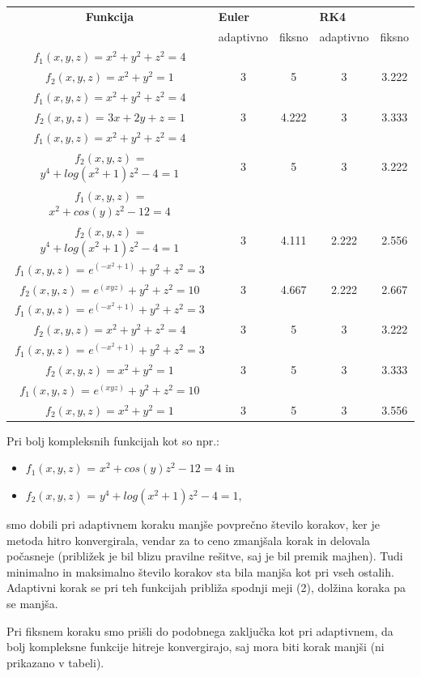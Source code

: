 \documentclass[12pt]{article}
\begin{document}
	\begin{tabular}{|c | c | c | c | c |} 
		\hline
		\textbf{Funkcija} &\multicolumn{2}{|l|}{\textbf{Euler}} &\multicolumn{2}{|l|}{\textbf{RK4}}\\                
		\small &adaptivno & fiksno & adaptivno & fiksno \\ 
		\hline
		\small{}$f_{1}(x,y,z)=x^{2} + y^{2}+ z^{2}=4$ & & & &\\ 
		\small{}$f_{2}(x,y,z)=x^{2} + y^{2}    =1$  & 3 & 5 & 3 & 3.222 \\
		\hline
		\small{}$f_{1}(x,y,z)=x^{2} + y^{2}+ z^{2}=4$ & & & &\\ 
		\small{}$f_{2}(x,y,z)$ = $3x + 2y + z = 1$  & 3 & 4.222 & 3 & 3.333 \\
		\hline
		\small{}$f_{1}(x,y,z)=x^{2} + y^{2}+ z^{2}=4$ & & & &\\ 
		\small{}$f_{2}(x,y,z)$ = $y^4 + log(x^2 + 1)z^2 - 4 = 1$  & 3 & 5 & 3 & 3.222 \\
		\hline
		\small{}$f_{1}(x,y,z)$ = $x^2 + cos(y)z^2 - 12 = 4$ & & & &\\ 
		\small{}$f_{2}(x,y,z)$ = $y^4 + log(x^2 + 1)z^2 - 4 = 1$  & 3 & 4.111 & 2.222 & 2.556 \\
		\hline
		\small{}$f_{1}(x,y,z)$ = $e^{(-x^{2}+1)}+y^{2}+z^{2} = 3$ & & & &\\ 
		\small{}$f_{2}(x,y,z)$ = $e^{(xyz)}+y^{2}+z^{2} = 10$  & 3 & 4.667 & 2.222 & 2.667 \\
		\hline
		\small{}$f_{1}(x,y,z)$ = $e^{(-x^{2}+1)}+y^{2}+z^{2} = 3$ & & & &\\ 
		\small{}$f_{2}(x,y,z)=x^{2} + y^{2}+ z^{2}=4$  & 3 & 5 & 3 & 3.222 \\
		\hline
		\small{}$f_{1}(x,y,z)$ = $e^{(-x^{2}+1)}+y^{2}+z^{2} = 3$ & & & &\\ 
		\small{}$f_{2}(x,y,z)=x^{2} + y^{2}    =1$  & 3 & 5 & 3 & 3.333 \\
		\hline
		\small{}$f_{1}(x,y,z)$ = $e^{(xyz)}+y^{2}+z^{2} = 10$ & & & &\\ 
		\small{}$f_{2}(x,y,z)=x^{2} + y^{2}    =1$  & 3 & 5 & 3 & 3.556 \\
		\hline
	\end{tabular}
	\newline
	\newline
	Pri bolj kompleksnih funkcijah kot so npr.:
	\begin{itemize}
		\item $f_{1}(x,y,z)$ = $x^2 + cos(y)z^2 - 12 = 4$  in \item $f_{2}(x,y,z)$ = $y^4 + log(x^2 + 1)z^2 - 4 = 1$,
	\end{itemize}
	smo dobili pri adaptivnem koraku manjše povprečno število korakov, ker je metoda hitro konvergirala, vendar za to ceno zmanjšala korak in delovala počasneje (približek je bil blizu pravilne rešitve, saj je bil premik majhen). Tudi minimalno in maksimalno število korakov sta bila manjša kot pri vseh ostalih. Adaptivni korak se pri teh funkcijah približa spodnji meji (2), dolžina koraka pa se manjša. 
	\par Pri fiksnem koraku smo prišli do podobnega zaključka kot pri adaptivnem, da bolj kompleksne funkcije hitreje konvergirajo, saj mora biti korak manjši (ni prikazano v tabeli).
	
\end{document}
